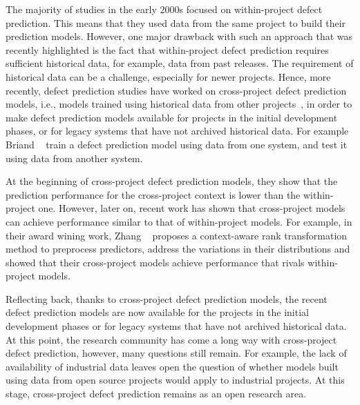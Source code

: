 The majority of studies in the early 2000s focused on within-project defect prediction. This means that they used data from the same project to build their prediction models. However, one major drawback with such an approach that was recently highlighted is the fact that within-project defect prediction requires sufficient historical data, for example, data from past releases. The requirement of historical data can be a challenge, especially for newer projects. Hence, more recently, defect prediction studies have worked on cross-project defect prediction models, i.e., models trained using historical data from other projects~\cite{Menzies2013TSE, Nam2013ICSE, Turhan2009ESE, Zhang2014MSR, Zimmermann2009FSE}, in order to make defect prediction models available for projects in the initial development phases, or for legacy systems that have not archived historical data. For example Briand \ea ~\cite{Briand2002TSE} train a defect prediction model using data from one system, and test it using data from another system.

At the beginning of cross-project defect prediction models, they show that the prediction performance for the cross-project context is lower than the within-project one. However, later on, recent work has shown that cross-project models can achieve performance similar to that of within-project models. For example, in their award wining work, Zhang \ea ~\cite{Zhang2014MSR} proposes a context-aware rank transformation method to preprocess predictors, address the variations in their distributions and showed that their cross-project models achieve performance that rivals within-project models.

Reflecting back, thanks to cross-project defect prediction models, the recent defect prediction models are now available for the projects in the initial development phases or for legacy systems that have not archived historical data.
At this point, the research community has come a long way with cross-project defect prediction, however, many questions still remain. For example, the lack of availability of industrial data leaves open the question of whether models built using data from open source projects would apply to industrial projects. At this stage, cross-project defect prediction remains as an open research area.

